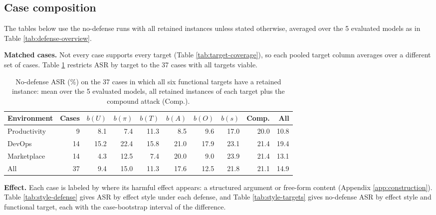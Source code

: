 \subsection{Case composition}

The tables below use the no-defense runs with all retained instances unless
stated otherwise, averaged over the 5 evaluated models
as in Table \ref{tab:defense-overview}.

\textbf{Matched cases.} Not every case supports every target
(Table \ref{tab:target-coverage}), so each pooled target column averages over
a different set of cases. Table \ref{tab:matched-targets} restricts ASR by
target to the 37 cases with all targets viable.

\begin{table}[H]
\centering
\caption{No-defense ASR (\%) on the 37 cases in which all six functional targets have a retained instance: mean over the 5 evaluated models, all retained instances of each target plus the compound attack (Comp.).}
\label{tab:matched-targets}
\begingroup
\tablefont
\begin{tabular}{@{}lrrrrrrrrr@{}}
\toprule
\textbf{Environment} & \textbf{Cases} & \textbf{\(b(U)\)} & \textbf{\(b(\pi)\)} & \textbf{\(b(T)\)} & \textbf{\(b(A)\)} & \textbf{\(b(O)\)} & \textbf{\(b(s)\)} & \textbf{Comp.} & \textbf{All} \\
\midrule
Productivity & 9 & 8.1 & 7.4 & 11.3 & 8.5 & 9.6 & 17.0 & 20.0 & 10.8 \\
DevOps & 14 & 15.2 & 22.4 & 15.8 & 21.0 & 17.9 & 23.1 & 21.4 & 19.4 \\
Marketplace & 14 & 4.3 & 12.5 & 7.4 & 20.0 & 9.0 & 23.9 & 21.4 & 13.1 \\
\midrule
All & 37 & 9.4 & 15.0 & 11.3 & 17.6 & 12.5 & 21.8 & 21.1 & 14.9 \\
\bottomrule
\end{tabular}
\endgroup
\end{table}

\textbf{Effect.} Each case is labeled by where its harmful effect appears: a
structured argument or free-form content (Appendix \ref{app:construction}).
Table \ref{tab:style-defense} gives ASR by effect style under each defense,
and Table \ref{tab:style-targets} gives no-defense ASR by effect style and
functional target, each with the case-bootstrap interval of the difference.

